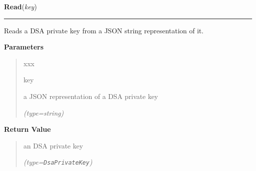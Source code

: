 \hspace{.8\funcindent}\begin{boxedminipage}{\funcwidth}

    \raggedright \textbf{Read}(\textit{key})

    \vspace{-1.5ex}

    \rule{\textwidth}{0.5\fboxrule}
\setlength{\parskip}{2ex}
    Reads a DSA private key from a JSON string representation of it.

\setlength{\parskip}{1ex}
      \textbf{Parameters}
      \vspace{-1ex}

      \begin{quote}
        \begin{Ventry}{xxx}

          \item[key]

          a JSON representation of a DSA private key

            {\it (type=string)}

        \end{Ventry}

      \end{quote}

      \textbf{Return Value}
    \vspace{-1ex}

      \begin{quote}
      an DSA private key

      {\it (type=\texttt{DsaPrivateKey})}

      \end{quote}

    \end{boxedminipage}

    \label{keyczar:keys:DsaPrivateKey:Sign}

    \vspace{0.5ex}

